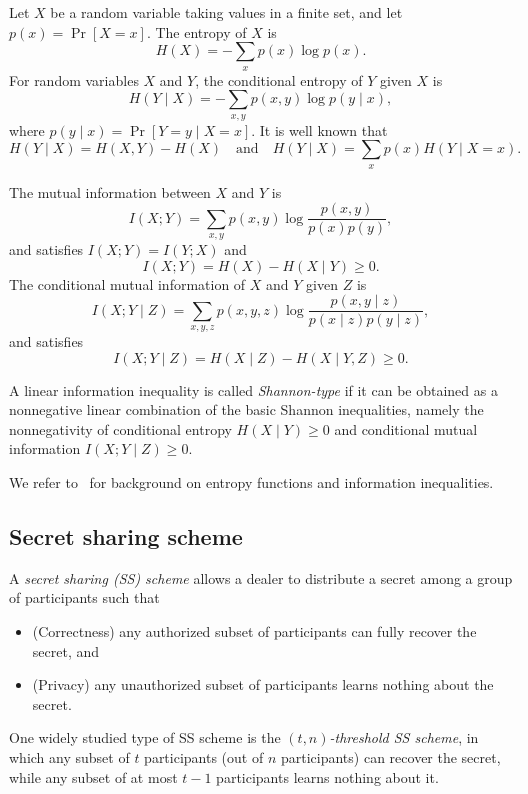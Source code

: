 \documentclass[11pt]{article}
\begin{document}
Let $X$ be a random variable taking values in a finite set, and let
$p(x) = \Pr[X = x]$. The entropy of $X$ is
\[
H(X) = - \sum_x p(x)\log p(x).
\]
For random variables $X$ and $Y$, the conditional entropy of $Y$ given $X$ is
\[
H(Y \mid X) = - \sum_{x,y} p(x,y)\log p(y \mid x),
\]
where $p(y \mid x) = \Pr[Y = y \mid X = x]$. It is well known that
\[
H(Y \mid X) = H(X,Y) - H(X)
\quad\text{and}\quad
H(Y \mid X) = \sum_x p(x) H(Y \mid X=x).
\]

The mutual information between $X$ and $Y$ is
\[
I(X;Y) = \sum_{x,y} p(x,y)\log \frac{p(x,y)}{p(x)p(y)},
\]
and satisfies $I(X;Y)=I(Y;X)$ and
\begin{equation}
I(X;Y) = H(X) - H(X \mid Y) \ge 0.
\end{equation}
The conditional mutual information of $X$ and $Y$ given $Z$ is
\[
I(X;Y \mid Z)
= \sum_{x,y,z} p(x,y,z)
\log \frac{p(x,y \mid z)}{p(x \mid z)p(y \mid z)},
\]
and satisfies
\begin{equation}
I(X;Y \mid Z) = H(X \mid Z) - H(X \mid Y,Z) \ge 0.
\end{equation}

A linear information inequality is called \emph{Shannon-type} if it can be obtained as a nonnegative linear combination of the basic Shannon inequalities, namely the nonnegativity of conditional entropy
$H(X \mid Y) \ge 0$
and conditional mutual information
$I(X;Y \mid Z) \ge 0$.


We refer to~\cite{yeung2002first} for background on entropy functions and information inequalities.



\subsection{Secret sharing scheme}

A \emph{secret sharing (SS) scheme} allows a dealer to distribute a secret among a group of participants such that
\begin{itemize}
	\item (Correctness) any authorized subset of participants can fully recover the secret, and
	\item (Privacy) any unauthorized subset of participants learns nothing about the secret.
\end{itemize}

One widely studied type of SS scheme is the \emph{$(t,n)$-threshold SS scheme}, in which any subset of $t$ participants (out of $n$ participants) can recover the secret, while any subset of at most $t-1$ participants learns nothing about it.
\end{document}
